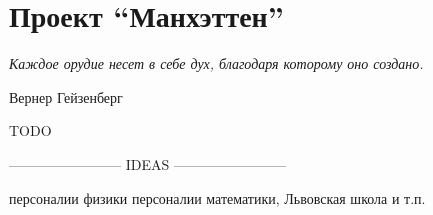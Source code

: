 \chapter{Проект ``Манхэттен''}

\epigraph{\emph{Каждое орудие несет в себе дух, \break благодаря которому оно создано.}}
{Вернер Гейзенберг}

TODO

------------------------ IDEAS ------------------------ 

персоналии физики
персоналии математики, Львовская школа и т.п.
